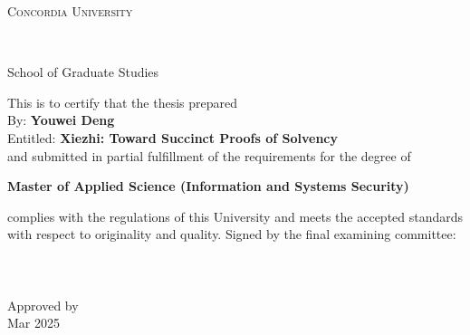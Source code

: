 
\thispagestyle{empty} %

\begin{center}\begin{Large} \textsc{Concordia University} \end{Large} \\
\begin{large} School of Graduate Studies \end{large} \end{center}
\vfill
This is to certify that the thesis prepared\\
By: \tab   \textbf{Youwei Deng} \\
Entitled: \tab \textbf{Xiezhi: Toward Succinct Proofs of Solvency}\\
 and submitted in partial fulfillment of the requirements for the degree of
\begin{center}
\textbf{Master of Applied Science (Information and Systems Security)}
\end{center}
complies with the regulations of this University and meets the
accepted standards with respect to originality and quality.
\vfill
\noindent Signed by the final examining committee: \\[1.3em]
\hspace*{1cm} \hrulefill {} \\[1.3em]
\hspace*{1cm} \hrulefill {} \\[1.3em]
\hspace*{1cm} \hrulefill {} \\[1.3em]
\vfill
\noindent Approved by \raisebox{-0.9em}{\rlap{\it}}\hrulefill \\[1.3em]
 Mar 2025 \raisebox{-0.9em}{\rlap{\it }}\hrulefill \\
